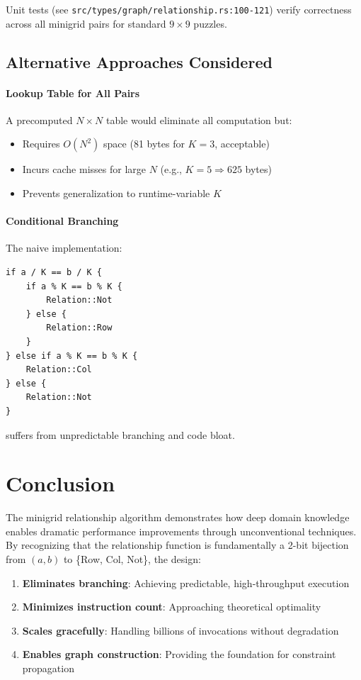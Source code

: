 \documentclass[11pt,a4paper]{article}
\begin{document}
Unit tests (see \texttt{src/types/graph/relationship.rs:100-121}) verify correctness across all minigrid pairs for standard $9 \times 9$ puzzles.

\subsection{Alternative Approaches Considered}

\paragraph{Lookup Table for All Pairs}
A precomputed $N \times N$ table would eliminate all computation but:
\begin{itemize}
    \item Requires $O(N^2)$ space (81 bytes for $K = 3$, acceptable)
    \item Incurs cache misses for large $N$ (e.g., $K = 5 \Rightarrow 625$ bytes)
    \item Prevents generalization to runtime-variable $K$
\end{itemize}

\paragraph{Conditional Branching}
The naive implementation:
\begin{lstlisting}
if a / K == b / K {
    if a % K == b % K {
        Relation::Not
    } else {
        Relation::Row
    }
} else if a % K == b % K {
    Relation::Col
} else {
    Relation::Not
}
\end{lstlisting}
suffers from unpredictable branching and code bloat.

\section{Conclusion}

The minigrid relationship algorithm demonstrates how deep domain knowledge enables dramatic performance improvements through unconventional techniques. By recognizing that the relationship function is fundamentally a 2-bit bijection from $(a, b)$ to \{Row, Col, Not\}, the design:

\begin{enumerate}
    \item \textbf{Eliminates branching}: Achieving predictable, high-throughput execution
    \item \textbf{Minimizes instruction count}: Approaching theoretical optimality
    \item \textbf{Scales gracefully}: Handling billions of invocations without degradation
    \item \textbf{Enables graph construction}: Providing the foundation for constraint propagation
\end{enumerate}
\end{document}
